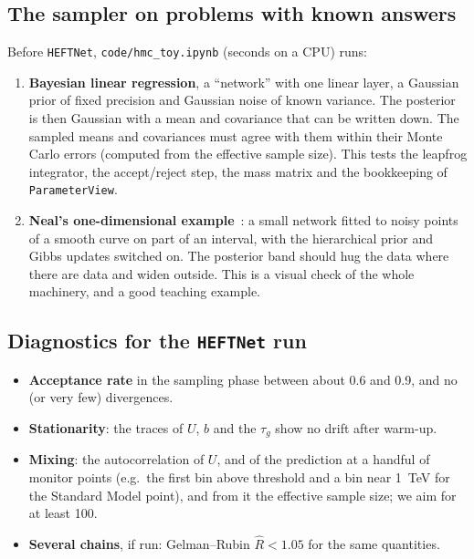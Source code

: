 \documentclass[11pt]{article}
\newcommand{\file}[1]{\nolinkurl{#1}}
\newcommand{\code}[1]{\texttt{#1}}
\begin{document}
\subsection{The sampler on problems with known answers}

Before \code{HEFTNet}, \file{code/hmc_toy.ipynb} (seconds on a CPU) runs:
\begin{enumerate}
  \item \textbf{Bayesian linear regression}, a ``network'' with one linear layer, a
    Gaussian prior of fixed precision and Gaussian noise of known variance. The posterior
    is then Gaussian with a mean and covariance that can be written down. The sampled
    means and covariances must agree with them within their Monte Carlo errors
    (computed from the effective sample size). This tests the leapfrog integrator, the
    accept/reject step, the mass matrix and the bookkeeping of \code{ParameterView}.
  \item \textbf{Neal's one-dimensional example}~\cite{neal1996}: a small network fitted
    to noisy points of a smooth curve on part of an interval, with the hierarchical
    prior and Gibbs updates switched on. The posterior band should hug the data where
    there are data and widen outside. This is a visual check of the whole machinery,
    and a good teaching example.
\end{enumerate}

\subsection{Diagnostics for the \texttt{HEFTNet} run}
\label{sec:diagnostics}

\begin{itemize}
  \item \textbf{Acceptance rate} in the sampling phase between about 0.6 and 0.9, and
    no (or very few) divergences.
  \item \textbf{Stationarity}: the traces of $U$, $b$ and the $\tau_g$ show no drift
    after warm-up.
  \item \textbf{Mixing}: the autocorrelation of $U$, and of the prediction at a handful
    of monitor points (e.g.\ the first bin above threshold and a bin near 1~TeV for the
    Standard Model point), and from it the effective sample size; we aim for at least 100.
  \item \textbf{Several chains}, if run: Gelman--Rubin $\hat R < 1.05$ for the same
    quantities.
\end{itemize}
\end{document}
